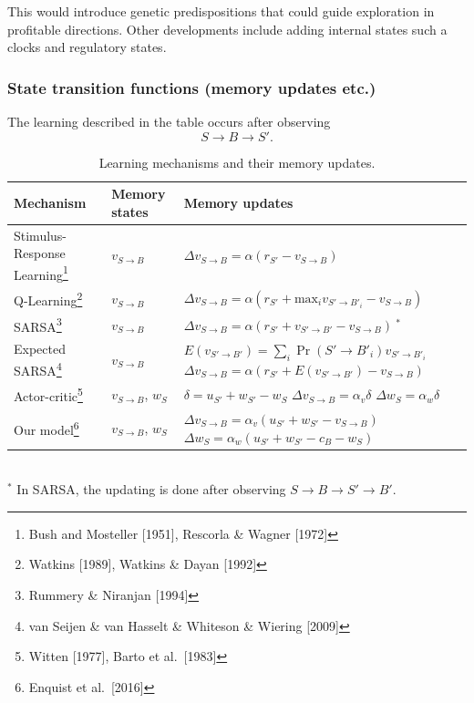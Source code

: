 \documentclass[11pt]{article}
\begin{document}
This would introduce genetic predispositions that could guide exploration
in profitable directions. Other developments include adding internal states
such a clocks and regulatory states.

\subsubsection{State transition functions (memory updates etc.)}
The learning described in the table occurs after observing
\[
S\rightarrow  B\rightarrow S'.
\]
\begin{table}[h]
	\def\arraystretch{1.2} %
	\begin{tabular}[t]{|L{2.2cm}|L{1.7cm}|L{7cm}|}
		\hline
		Mechanism             & Memory states   & Memory updates \\
		\hline
		Stimulus-Response Learning\footnote{Bush and Mosteller [1951], Rescorla \& Wagner [1972]}
		& $v_{S\to B}$        & $\Delta v_{S\to B}=\alpha(r_{S'}-v_{S\to B})$ \\ \hline
		Q-Learning\footnote{Watkins [1989], Watkins \& Dayan [1992]}
		& $v_{S\to B}$        & $\Delta v_{S\to B}=\alpha(r_{S'}+\textrm{max}_{i}v_{S'\to B'_{i}}-v_{S\to B})$ \\ \hline
		SARSA\footnote{Rummery \& Niranjan [1994]}
		& $v_{S\to B}$        & $\Delta v_{S\to B}=\alpha(r_{S'}+v_{S'\to B'}-v_{S\to B})\ ^*$ \\ \hline
		Expected SARSA\footnote{van Seijen \& van Hasselt \& Whiteson \& Wiering [2009]}
		& $v_{S\to B}$        & \parbox{7cm}{$E(v_{S'\to B'})=\sum_i\Pr(S'\to B'_i)v_{S'\to B'_i}$ \\ $\Delta v_{S\to B}=\alpha(r_{S'}+E(v_{S'\to B'})-v_{S\to B})$} \\ \hline
		Actor-critic\footnote{Witten [1977], Barto et al.\ [1983]}
		& $v_{S\to B}$, $w_S$ & \parbox{7cm}{$\delta=u_{S'}+w_{S'}-w_{S}$ \\$\Delta v_{S\to B}=\alpha_{v}\delta$ \\$\Delta w_{S}=\alpha_{w}\delta$} \\ \hline
		Our model\footnote{Enquist et al.\ [2016]}
		& $v_{S\to B}$, $w_S$ & \parbox{7 cm}{$\Delta v_{S\to B}=\alpha_{v}(u_{S'}+w_{S'}-v_{S\to B})$ \\$\Delta w_{S}=\alpha_{w}(u_{S'}+w_{S'}-c_{B}-w_{S})$} \\ \hline
	\end{tabular}
	\\
	$^*$ In SARSA, the updating is done after observing $S \to B \to S' \to B'$.
	\caption{Learning mechanisms and their memory updates. \label{tab:mechanisms}}
\end{table}
\end{document}
